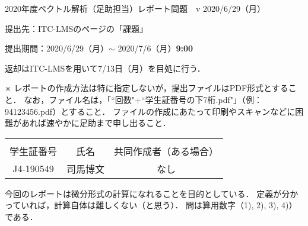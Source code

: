 \documentclass[dvipdfmx,nosetpagesize, uplatex]{jsarticle}
\newcommand\GAKUSEISHOBANGO{J4-190549}%
\newcommand\NAMAE{司馬博文}%
\newcommand\KYODOSAKUSEISHA{なし}%
\theoremstyle{definition}
\theoremstyle{StatementsWithStar}
\theoremstyle{StatementsWithStar2}
\theoremstyle{StatementsWithStar3}
\theoremstyle{StatementsWithCCirc}
\theoremstyle{definition}
\begin{document}
\thispagestyle{empty}
\setlength{\parindent}{1zw}
\setlength{\baselineskip}{13pt}
\setcounter{section}{9}
\setcounter{version}{1}
\noindent
2020年度ベクトル解析（足助担当）レポート問題~\thesection~v\theversion%
\hfil2020/6/29（月）\par\noindent
提出先：ITC-LMSのページの「課題」\par\noindent
提出期間：2020/6/29（月）$\sim$ 2020/7/6（月）\textbf{9:00}\par\noindent
返却はITC-LMSを用いて7/13日（月）を目処に行う．\par\noindent
※ レポートの作成方法は特に指定しないが，提出ファイルはPDF形式とすること．
なお，ファイル名は，「``回数"+``学生証番号の下7桁.pdf\/"」（例：94123456.pdf）とすること．
ファイルの作成にあたって印刷やスキャンなどに困難があれば速やかに足助まで申し出ること．
\vskip-18pt\noindent
\begin{table}[h]
\begin{tabular}{|c|c|c|} \hline
& & \\[-13pt]
学生証番号& 氏名 & 共同作成者（ある場合）\\[2pt] \hline
\rule{0pt}{16pt}%
\parbox[c]{9.2zw}{\GAKUSEISHOBANGO\hfill} & \parbox[c]{13.0zw}{\NAMAE\hfill} & \parbox[c]{25.6zw}{\KYODOSAKUSEISHA\hfill}\\[6pt] \hline
\end{tabular}
\end{table}

\noindent
今回のレポートは微分形式の計算になれることを目的としている．
定義が分かっていれば，計算自体は難しくない（と思う）．
問は算用数字（1), 2), 3), 4)）である．
\end{document}
